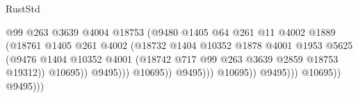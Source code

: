 \begin{lexlean}{RustStd}
\begin{coremodule}
                                                    @99
                                                    @263
                                                    @3639
                                                    @4004
                                                    @18753
                                                    (@9480
                                                      @1405
                                                      @64
                                                      @261
                                                      @11
                                                      @4002
                                                      @1889
                                                      (@18761
                                                        @1405
                                                        @261
                                                        @4002
                                                        (@18732
                                                          @1404
                                                          @10352
                                                          @1878
                                                          @4001
                                                          @1953
                                                          @5625
                                                          (@9476
                                                            @1404
                                                            @10352
                                                            @4001
                                                            (@18742
                                                              @717
                                                              @99
                                                              @263
                                                              @3639
                                                              @2859
                                                              @18753
                                                              @19312))
                                                          @10695))
                                                      @9495)))
                                                @10695))
                                            @9495)))
                                      @10695))
                                  @9495)))
                            @10695))
                        @9495)))

\end{coremodule}
\end{lexlean}
